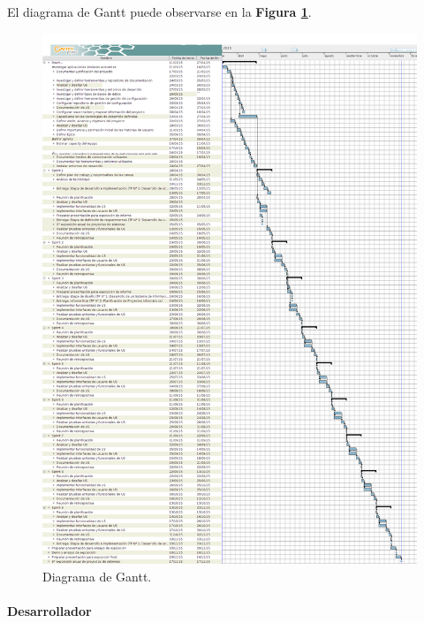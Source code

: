 El diagrama de Gantt puede observarse en la \textbf{Figura \ref{imagenGantt}}.

\begin{figure}
  \centering
  \includegraphics[width=.8\textwidth]{img/tp2_definicion/gantt}
  \caption{Diagrama de Gantt.}
  \label{imagenGantt}
\end{figure}

\newpage

                   
    
		\paragraph{Desarrollador}
		
